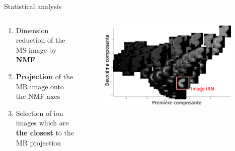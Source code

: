 \documentclass[10pt]{beamer}
\begin{document}
\begin{frame}{Statistical analysis}
  
  \begin{columns}
    \begin{column}[t]{0.6\textwidth}
      \begin{enumerate}
      \item Dimension reduction of the MS image by \textbf{NMF} 
      \item \textbf{Projection} of the MR image onto the NMF axes
      \item Selection of ion images which are \textbf{the closest} to the MR projection
      \end{enumerate}
    \end{column}
    \begin{column}[t]{0.4\textwidth}
      \begin{figure}[ht]
        \centering
        \includegraphics[width=0.95\textwidth]{fig/pca_big3}
      \end{figure}
    \end{column}
  \end{columns}
\end{frame}
\end{document}
